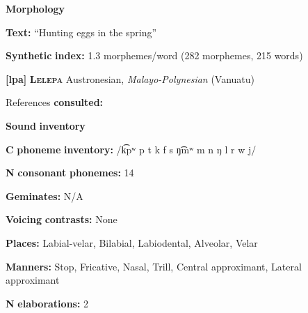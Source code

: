 \documentclass[output=paper]{langsci/langscibook}
\begin{document}
\begin{styleBody}
\textbf{Morphology}
\end{styleBody}

\begin{styleBody}
\textbf{Text:} “Hunting eggs in the spring” \citep[95-96]{Ingham2003}
\end{styleBody}

\begin{styleBody}
\textbf{Synthetic} \textbf{index:} 1.3 morphemes/word (282 morphemes, 215 words)
\end{styleBody}

\begin{styleBody}
\textbf{[lpa]}   \textbf{\textsc{Lelepa}}  Austronesian, \textit{Malayo-Polynesian} (Vanuatu)
\end{styleBody}

\begin{styleBody}
References \textbf{consulted:} \citet{Lacrampe2014}
\end{styleBody}

\begin{styleBody}
\textbf{Sound} \textbf{inventory}
\end{styleBody}

\begin{styleBody}
\textbf{C} \textbf{phoneme} \textbf{inventory:} /k͡pʷ p t k f s ŋ͡mʷ m n ŋ l r w j/
\end{styleBody}

\begin{styleBody}
\textbf{N} \textbf{consonant} \textbf{phonemes:} 14
\end{styleBody}

\begin{styleBody}
\textbf{Geminates:} N/A
\end{styleBody}

\begin{styleBody}
\textbf{Voicing} \textbf{contrasts:} None
\end{styleBody}

\begin{styleBody}
\textbf{Places:} Labial-velar, Bilabial, Labiodental, Alveolar, Velar
\end{styleBody}

\begin{styleBody}
\textbf{Manners:} Stop, Fricative, Nasal, Trill, Central approximant, Lateral approximant
\end{styleBody}

\begin{styleBody}
\textbf{N} \textbf{elaborations:} 2
\end{styleBody}
\end{document}

